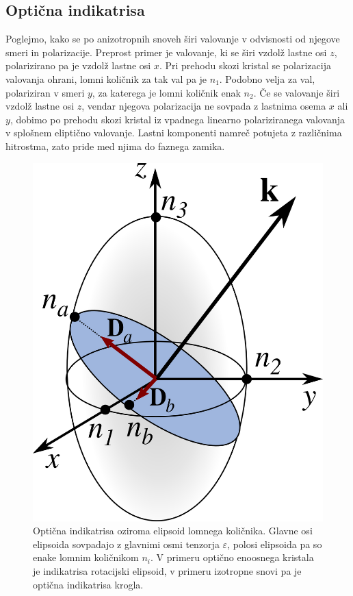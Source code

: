\subsection*{Optična indikatrisa}
Poglejmo, kako se po anizotropnih snoveh širi valovanje v odvisnosti
od njegove smeri in polarizacije. Preprost primer je valovanje, ki se širi vzdolž lastne
osi $z$, polarizirano pa je vzdolž lastne osi $x$. Pri prehodu
skozi kristal se polarizacija valovanja ohrani, lomni količnik za
tak val pa je $n_{1}$. Podobno velja za val, polariziran v smeri
$y$, za katerega je lomni količnik enak $n_{2}$. Če se valovanje širi vzdolž lastne
osi $z$, vendar njegova polarizacija ne sovpada z lastnima osema
$x$ ali $y$, dobimo po prehodu skozi kristal iz vpadnega linearno polariziranega valovanja
v splošnem eliptično valovanje. Lastni komponenti namreč potujeta z različnima
hitrostma, zato pride med njima do faznega zamika.\\
\begin{figure}[h]
\centering
\includegraphics[width=4truecm]{slike/01_indikatrisa.png}
\caption{\label{fig:Indikatrisa}Optična indikatrisa oziroma elipsoid lomnega količnika. Glavne osi
elipsoida sovpadajo z glavnimi osmi tenzorja $\varepsilon$, polosi elipsoida pa so enake
lomnim količnikom $n_i$. V primeru optično enoosnega kristala je indikatrisa  
rotacijski elipsoid, v primeru izotropne snovi pa je optična indikatrisa krogla. }
\end{figure}


